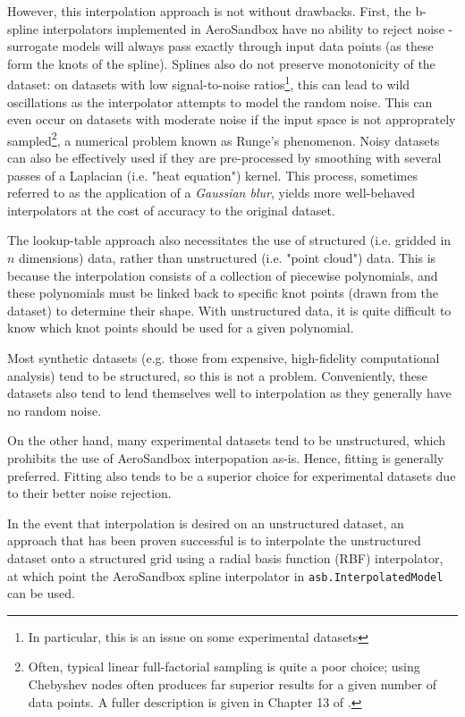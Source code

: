 However, this interpolation approach is not without drawbacks. First, the b-spline interpolators implemented in AeroSandbox have no ability to reject noise - surrogate models will always pass exactly through input data points (as these form the knots of the spline). Splines also do not preserve monotonicity of the dataset: on datasets with low signal-to-noise ratios\footnote{In particular, this is an issue on some experimental datasets}, this can lead to wild oscillations as the interpolator attempts to model the random noise. This can even occur on datasets with moderate noise if the input space is not approprately sampled\footnote{Often, typical linear full-factorial sampling is quite a poor choice; using Chebyshev nodes often produces far superior results for a given number of data points. A fuller description is given in Chapter 13 of \cite{koch2019}.}, a numerical problem known as Runge's phenomenon. Noisy datasets can also be effectively used if they are pre-processed by smoothing with several passes of a Laplacian (i.e. "heat equation") kernel. This process, sometimes referred to as the application of a \textit{Gaussian blur}, yields more well-behaved interpolators at the cost of accuracy to the original dataset.

The lookup-table approach also necessitates the use of structured (i.e. gridded in $n$ dimensions) data, rather than unstructured (i.e. "point cloud") data. This is because the interpolation consists of a collection of piecewise polynomials, and these polynomials must be linked back to specific knot points (drawn from the dataset) to determine their shape. With unstructured data, it is quite difficult to know which knot points should be used for a given polynomial.

Most synthetic datasets (e.g. those from expensive, high-fidelity computational analysis) tend to be structured, so this is not a problem. Conveniently, these datasets also tend to lend themselves well to interpolation as they generally have no random noise.

On the other hand, many experimental datasets tend to be unstructured, which prohibits the use of AeroSandbox interpopation as-is. Hence, fitting is generally preferred. Fitting also tends to be a superior choice for experimental datasets due to their better noise rejection.

In the event that interpolation is desired on an unstructured dataset, an approach that has been proven successful is to interpolate the unstructured dataset onto a structured grid using a radial basis function (RBF) interpolator, at which point the AeroSandbox spline interpolator in \texttt{asb.InterpolatedModel} can be used.